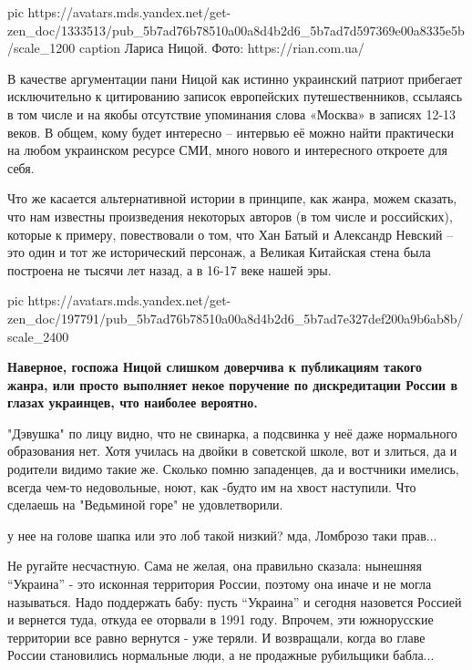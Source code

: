 \ifcmt
  pic https://avatars.mds.yandex.net/get-zen_doc/1333513/pub_5b7ad76b78510a00a8d4b2d6_5b7ad7d597369e00a8335e5b/scale_1200
  caption Лариса Ницой. Фото: https://rian.com.ua/
\fi

В качестве аргументации пани Ницой как истинно украинский патриот прибегает
исключительно к цитированию записок европейских путешественников, ссылаясь в
том числе и на якобы отсутствие упоминания слова «Москва» в записях 12-13
веков. В общем, кому будет интересно – интервью её можно найти практически на
любом украинском ресурсе СМИ, много нового и интересного откроете для себя.

Что же касается альтернативной истории в принципе, как жанра, можем сказать,
что нам известны произведения некоторых авторов (в том числе и российских),
которые к примеру, повествовали о том, что Хан Батый и Александр Невский – это
один и тот же исторический персонаж, а Великая Китайская стена была построена
не тысячи лет назад, а в 16-17 веке нашей эры.

\ifcmt
pic https://avatars.mds.yandex.net/get-zen_doc/197791/pub_5b7ad76b78510a00a8d4b2d6_5b7ad7e327def200a9b6ab8b/scale_2400
\fi

\textbf{Наверное, госпожа Ницой слишком доверчива к публикациям такого жанра, или
просто выполняет некое поручение по дискредитации России в глазах украинцев,
что наиболее вероятно.}

\begin{itemize}

"Дэвушка" по лицу видно, что не свинарка, а подсвинка у неё даже нормального
образования нет. Хотя училась на двойки в советской школе, вот и злиться, да и
родители видимо такие же. Сколько помню западенцев, да и востчники имелись,
всегда чем-то недовольные, ноют, как -будто им на хвост наступили. Что сделаешь
на "Ведьминой горе" не удовлетворили.	


у нее на голове шапка или это лоб такой низкий? мда, Ломброзо таки прав...


Не ругайте несчастную. Сама не желая, она правильно сказала: нынешняя \enquote{Украина}
- это исконная территория России, поэтому она иначе и не могла называться. Надо
поддержать бабу: пусть \enquote{Украина} и сегодня назовется Россией и вернется туда,
откуда ее оторвали в 1991 году. Впрочем, эти южнорусские территории все равно
вернутся - уже теряли. И возвращали, когда во главе России становились
нормальные люди, а не продажные рубильщики бабла...
\end{itemize}
